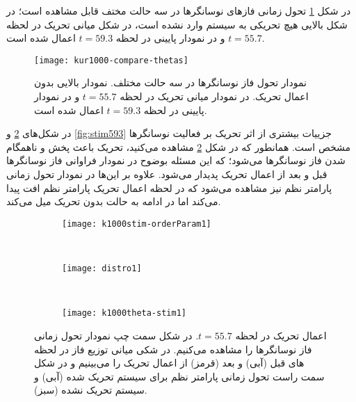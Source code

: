 در شکل 
\ref{fig:kur-compare-thetas}
تحول زمانی فازهای نوسانگرها در سه حالت مختف قابل مشاهده است؛ در شکل بالایی هیچ تحریکی به سیستم وارد نشده است، در شکل میانی تحریک در لحظه 
$t=55.7$
و در نمودار پایینی در لحظه 
$t=59.3$
اعمال شده است. 

\begin{figure}
	\centering
	\texttt{[image: kur1000-compare-thetas]}
    \caption{
نمودار تحول فاز نوسانگرها در سه حالت مختلف. نمودار بالایی بدون اعمال تحریک. در نمودار میانی تحریک در لحظه 
$t=55.7$
و در نمودار پایینی در لحظه 
$t=59.3$
اعمال شده است.
    }
    \label{fig:kur-compare-thetas}
\end{figure}

در شکل‌های 
\ref{fig:stim557}
و
\ref{fig:stim593}
جزییات بیشتری از اثر تحریک بر فعالیت نوسانگرها مشخص است. همانطور که در شکل \ref{fig:stim557} مشاهده می‌کنید، تحریک باعث پخش و ناهمگام شدن فاز نوسانگرها می‌شود؛ که این مسئله بوضوح در نمودار فراوانی فاز نوسانگرها قبل و بعد از اعمال تحریک پدیدار می‌شود. علاوه بر این‌ها در نمودار تحول زمانی پارامتر نظم نیز مشاهده می‌شود که در لحظه اعمال تحریک پارامتر نظم افت پیدا می‌کند اما در ادامه به حالت بدون تحریک میل می‌کند.

\begin{figure}
     \centering
     \begin{subfigure}[t]{0.3\textwidth}
         \centering
         \texttt{[image: k1000stim-orderParam1]}
     \end{subfigure}
     \
     \begin{subfigure}[t]{0.2\textwidth}
         \centering
         \texttt{[image: distro1]}
     \end{subfigure}
     \
     \begin{subfigure}[t]{0.4\textwidth}
         \centering
         \texttt{[image: k1000theta-stim1]}
     \end{subfigure}
        \caption{
اعمال تحریک در لحظه 
$t=55.7$.
در شکل سمت چپ نمودار تحول زمانی فاز نوسانگرها را مشاهده می‌کنیم. در شکی میانی توزیع فاز در لحظه های قبل (آبی) و بعد (قرمز) از اعمال تحریک را می‌بینیم و در شکل سمت راست تحول زمانی پارامتر نظم برای سیستم تحریک شده (آبی) و سیستم تحریک نشده  (سبز).
         }
        \label{fig:stim557}
\end{figure}

